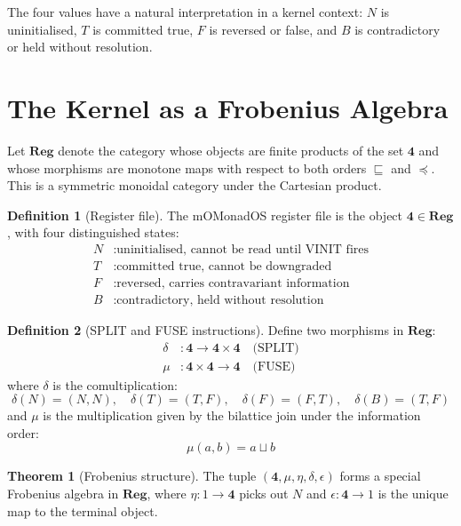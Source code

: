 \documentclass[11pt,a4paper]{article}
\theoremstyle{definition}
\newtheorem{definition}{Definition}[section]
\newtheorem{theorem}{Theorem}[section]
\newcommand{\reg}{\mathbf{Reg}}
\begin{document}
The four values have a natural interpretation in a kernel context: $N$ is uninitialised, $T$ is committed true, $F$ is reversed or false, and $B$ is contradictory or held without resolution.

\section{The Kernel as a Frobenius Algebra}

Let $\reg$ denote the category whose objects are finite products of the set $\mathbf{4}$ and whose morphisms are monotone maps with respect to both orders $\sqsubseteq$ and $\preceq$. This is a symmetric monoidal category under the Cartesian product.

\begin{definition}[Register file]
The mOMonadOS register file is the object $\mathbf{4} \in \reg$, with four distinguished states:
\begin{align*}
N &: \text{uninitialised, cannot be read until VINIT fires} \\
T &: \text{committed true, cannot be downgraded} \\
F &: \text{reversed, carries contravariant information} \\
B &: \text{contradictory, held without resolution}
\end{align*}
\end{definition}

\begin{definition}[SPLIT and FUSE instructions]
Define two morphisms in $\reg$:
\begin{align*}
\delta &: \mathbf{4} \to \mathbf{4} \times \mathbf{4} \quad \text{(SPLIT)} \\
\mu &: \mathbf{4} \times \mathbf{4} \to \mathbf{4} \quad \text{(FUSE)}
\end{align*}
where $\delta$ is the comultiplication:
\[
\delta(N) = (N,N),\quad \delta(T) = (T,F),\quad \delta(F) = (F,T),\quad \delta(B) = (T,F)
\]
and $\mu$ is the multiplication given by the bilattice join under the information order:
\[
\mu(a,b) = a \sqcup b
\]
\end{definition}

\begin{theorem}[Frobenius structure]
The tuple $(\mathbf{4}, \mu, \eta, \delta, \epsilon)$ forms a special Frobenius algebra in $\reg$, where $\eta : 1 \to \mathbf{4}$ picks out $N$ and $\epsilon : \mathbf{4} \to 1$ is the unique map to the terminal object.
\end{theorem}
\end{document}
